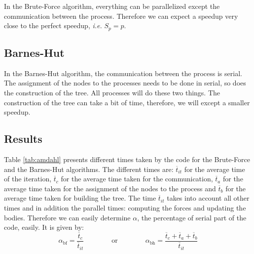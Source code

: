 \documentclass[10pt,a4paper]{article}
\begin{document}
In the Brute-Force algorithm, everything can be parallelized except the communication between the process. Therefore we can expect a speedup very close to the perfect speedup, {\it i.e.} $S_p = p$.

\subsection{Barnes-Hut}

In the Barnes-Hut algorithm, the communication between the process is serial. The assignment of the nodes to the processes needs to be done in serial, so does the construction of the tree. All processes will do these two things. The construction of the tree can take a bit of time, therefore, we will except a smaller speedup.

\subsection{Results}

Table \ref{tab:amdahl} presents different times taken by the code for the Brute-Force and the Barnes-Hut algorithms. The different times are: $\overline{t}_{it}$ for the average time of the iteration, $\overline{t}_{c}$ for the average time taken for the communication, $\overline{t}_{a}$ for the average time taken for the assignment of the nodes to the process and $\overline{t}_{b}$ for the average time taken for building the tree. The time $\overline{t}_{it}$ takes into account all other times and in addition the parallel times: computing the forces and updating the bodies. Therefore we can easily determine $\alpha$, the percentage of serial part of the code, easily. It is given by:
\[
\alpha_{\text{bf}} = \frac{\overline{t}_{c}}{\overline{t}_{it}} \qquad\qquad \text{or} \qquad\qquad \alpha_{\text{bh}} = \frac{\overline{t}_{c} + \overline{t}_{a} + \overline{t}_{b}}{\overline{t}_{it}}
\]
\end{document}
